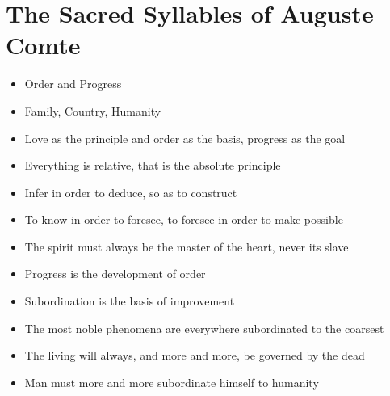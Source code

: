 \section{The Sacred Syllables of Auguste Comte}

\begin{itemize}
\item Order and Progress

\item Family, Country, Humanity

\item Love as the principle and order as the basis, progress as the goal

\item Everything is relative, that is the absolute principle

\item Infer in order to deduce, so as to construct

\item To know in order to foresee, to foresee in order to make possible

\item The spirit must always be the master of the heart, never its slave

\item Progress is the development of order

\item Subordination is the basis of improvement

\item The most noble phenomena are everywhere subordinated to the coarsest

\item The living will always, and more and more, be governed by the dead

\item Man must more and more subordinate himself to humanity
\end{itemize}






